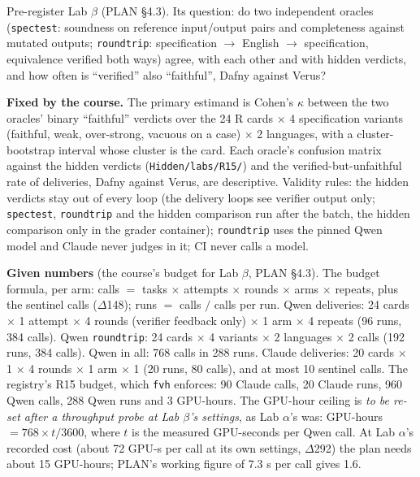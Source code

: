 \documentclass[11pt]{article}
\begin{document}
\begin{problem}\label{prob:B6}
Pre-register Lab $\beta$ (PLAN \S4.3). Its question: do two independent oracles
(\texttt{spectest}: soundness on reference input/output pairs and completeness
against mutated outputs; \texttt{roundtrip}: specification $\to$ English $\to$
specification, equivalence verified both ways) agree, with each other and with
hidden verdicts, and how often is ``verified'' also ``faithful'', Dafny
against Verus?

\textbf{Fixed by the course.} The primary estimand is Cohen's $\kappa$ between
the two oracles' binary ``faithful'' verdicts over the 24 R cards $\times$ 4
specification variants (faithful, weak, over-strong, vacuous on a case)
$\times$ 2 languages, with a cluster-bootstrap interval whose cluster is the
card. Each oracle's confusion matrix against the hidden verdicts
(\texttt{Hidden/labs/R15/}) and the verified-but-unfaithful rate of
deliveries, Dafny against Verus, are descriptive. Validity rules: the hidden
verdicts stay out of every loop (the delivery loops see verifier output only;
\texttt{spectest}, \texttt{roundtrip} and the hidden comparison run after the
batch, the hidden comparison only in the grader container); \texttt{roundtrip}
uses the pinned Qwen model and Claude never judges in it; CI never calls a
model.

\textbf{Given numbers} (the course's budget for Lab $\beta$, PLAN \S4.3).
The budget formula, per arm: calls $=$ tasks $\times$ attempts $\times$ rounds
$\times$ arms $\times$ repeats, plus the sentinel calls ($\Delta$148); runs
$=$ calls $/$ calls per run. Qwen deliveries: 24 cards $\times$ 1 attempt
$\times$ 4 rounds (verifier feedback only) $\times$ 1 arm $\times$ 4 repeats
(96 runs, 384 calls). Qwen \texttt{roundtrip}: 24 cards $\times$ 4 variants
$\times$ 2 languages $\times$ 2 calls (192 runs, 384 calls). Qwen in all: 768
calls in 288 runs. Claude deliveries: 20 cards $\times$ 1 $\times$ 4 rounds
$\times$ 1 arm $\times$ 1 (20 runs, 80 calls), and at most 10 sentinel calls.
The registry's R15 budget, which \texttt{fvh} enforces: 90 Claude calls, 20
Claude runs, 960 Qwen calls, 288 Qwen runs and 3 GPU-hours. The GPU-hour
ceiling is \emph{to be re-set after a throughput probe at Lab $\beta$'s
settings}, as Lab $\alpha$'s was: GPU-hours $= 768 \times t / 3600$, where $t$
is the measured GPU-seconds per Qwen call. At Lab $\alpha$'s recorded cost
(about 72 GPU-s per call at its own settings, $\Delta$292) the plan needs
about 15 GPU-hours; PLAN's working figure of 7.3 s per call gives 1.6.


\end{problem}
\end{document}
